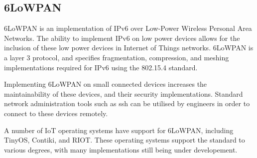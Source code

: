 \subsection{6LoWPAN}

6LoWPAN is an implementation of IPv6 over Low-Power Wireless Personal Area
Networks. The ability to implement IPv6 on low power devices allows for the
inclusion of these low power devices in Internet of Things networks. 6LoWPAN is
a layer 3 protocol, and specifies fragmentation, compression, and meshing
implementations required for IPv6 using the 802.15.4
standard\cite{ott_2012}\cite{schmidt_2017}.

Implementing 6LoWPAN on small connected devices increases the maintainability of
these devices, and their security implementations. Standard network
administration tools such as ssh can be utilised by engineers in order to
connect to these devices remotely\cite{ott_2012}.

A number of IoT operating systems have support for 6LoWPAN, including TinyOS,
Contiki, and RIOT\cite{schmidt_2017}. These operating systems support the
standard to various degrees, with many implementations still being under
developement.
